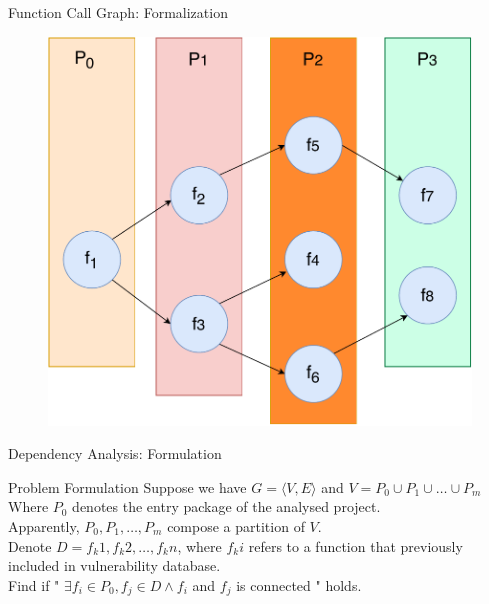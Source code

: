 \documentclass{beamer}
\begin{document}
\begin{frame}{Function Call Graph: Formalization}
\begin{figure}
    \centering
    \includegraphics[height=0.8\textheight]{formalization_1.pdf}
\end{figure}
\end{frame}

\begin{frame}{Dependency Analysis: Formulation}
\begin{block}{Problem Formulation}
Suppose we have $G=\langle V, E\rangle$ and $V = P_0\cup P_1\cup \dots \cup P_m$\\
Where $P_0$ denotes the entry package of the analysed project.\\
Apparently, $P_0, P_1, \dots, P_m$ compose a partition of $V$.\\
Denote $D={f_k1,f_k2,\dots, f_kn}$, where $f_ki$ refers to a function that previously included in vulnerability database.\\
Find if " $\exists f_i\in P_0, f_j \in D \wedge f_i $ and $f_j$ is connected " holds.
\end{block}
\end{frame}
\end{document}
